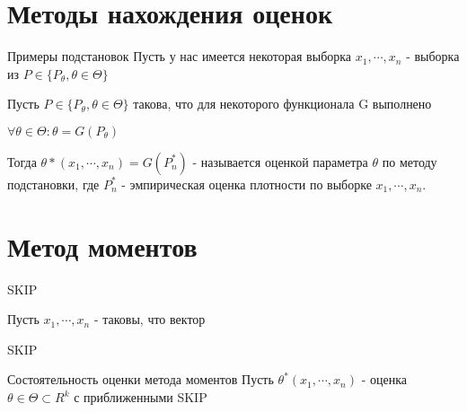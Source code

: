 \section{Методы нахождения оценок}
Примеры подстановок
Пусть у нас имеется некоторая выборка $x_1, \cdots, x_n$ - выборка из $P \in \{P_{\theta}, \theta \in \Theta\}$

Пусть $P \in \{P_{\theta}, \theta \in \Theta\}$ такова, что для некоторого функционала G выполнено

$\forall \theta \in \Theta: \theta = G(P_{\theta})$

Тогда $\theta*(x_1, \cdots, x_n) = G(P_n^*)$ - называется оценкой параметра $\theta$ по методу подстановки,
где $P_n^*$ - эмпирическая оценка плотности по выборке $x_1, \cdots, x_n$.

\section{Метод моментов}
SKIP

Пусть $x_1, \cdots, x_n$ - таковы, что вектор

SKIP


\begin{theorem} Состоятельность оценки метода моментов
    Пусть $\theta^*(x_1, \cdots, x_n)$ - оценка $\theta \in \Theta \subset R^k$ с приближенными SKIP
\end{theorem}

